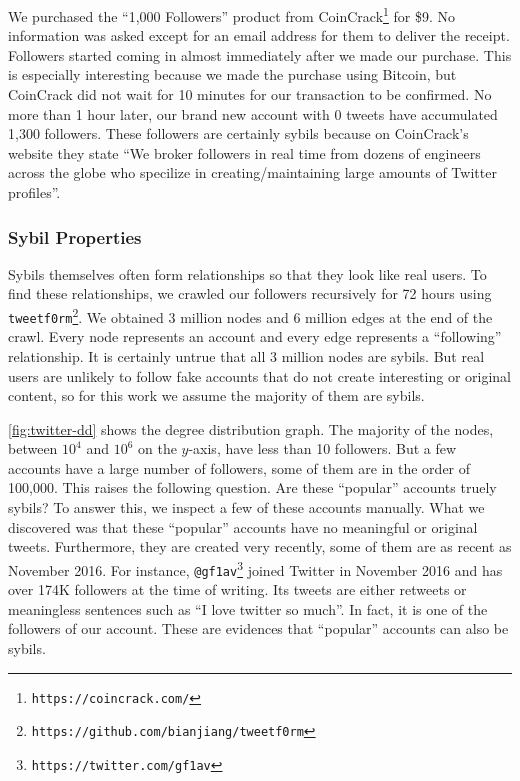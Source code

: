 We purchased the ``1,000 Followers'' product from
CoinCrack\footnote{\texttt{https://coincrack.com/}} for \$9. No information was
asked except for an email address for them to deliver the receipt. Followers
started coming in almost immediately after we made our purchase. This is
especially interesting because we made the purchase using Bitcoin, but CoinCrack
did not wait for 10 minutes for our transaction to be confirmed. No more than 1
hour later, our brand new account with 0 tweets have accumulated 1,300
followers. These followers are certainly sybils because on CoinCrack's website
they state ``We broker followers in real time from dozens of engineers across
the globe who specilize in creating/maintaining large amounts of Twitter
profiles''.

\subsubsection{Sybil Properties}
Sybils themselves often form relationships so that they look like real users. To
find these relationships, we crawled our followers recursively for 72 hours
using
\verb!tweetf0rm!\footnote{\texttt{https://github.com/bianjiang/tweetf0rm}}. We
obtained 3 million nodes and 6 million edges at the end of the crawl. Every node
represents an account and every edge represents a ``following'' relationship. It
is certainly untrue that all 3 million nodes are sybils. But real users are
unlikely to follow fake accounts that do not create interesting or original
content, so for this work we assume the majority of them are sybils.

\autoref{fig:twitter-dd} shows the degree distribution graph. The majority of
the nodes, between $10^4$ and $10^6$ on the $y$-axis, have less than 10
followers. But a few accounts have a large number of followers, some of them are
in the order of 100,000. This raises the following question. Are these
``popular'' accounts truely sybils? To answer this, we inspect a few of these
accounts manually. What we discovered was that these ``popular'' accounts have
no meaningful or original tweets. Furthermore, they are created very recently,
some of them are as recent as November 2016. For instance,
\verb!@gf1av!\footnote{\texttt{https://twitter.com/gf1av}} joined Twitter in
November 2016 and has over 174K followers at the time of writing. Its tweets are
either retweets or meaningless sentences such as ``I love twitter so much''. In
fact, it is one of the followers of our account. These are evidences that
``popular'' accounts can also be sybils.

